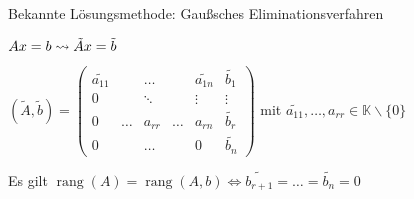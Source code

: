 \documentclass[11pt]{scrartcl}
\DeclareMathOperator*{\rang}{\mathrm{rang}}
\theoremstyle{break}
\theoremstyle{remark}
\begin{document}
Bekannte Lösungsmethode: Gaußsches Eliminationsverfahren

$Ax=b \rightsquigarrow \tilde{A}x = \tilde{b} \\$

\(
(\tilde{A},\tilde{b})=
\begin{pmatrix}
\tilde{a_{11}} & &\dots  &  & \tilde{a_{1n}} & \tilde{b_1} \\
0 & & \ddots &  & \vdots & \vdots \\
0 & \dots & a_{rr} & \dots & a_{rn} & \tilde{b_r} \\
0 & & \dots & & 0 & \tilde{b_n} \end{pmatrix}
\)
mit $\tilde{a_{11}}, \dots, a_{rr} \in \mathbb{K} \backslash \{0\} $

Es gilt $\rang(A)= \rang(A,b) \Leftrightarrow
\tilde{b_{r+1}} = \dots = \tilde{b_n} = 0$
\end{document}
